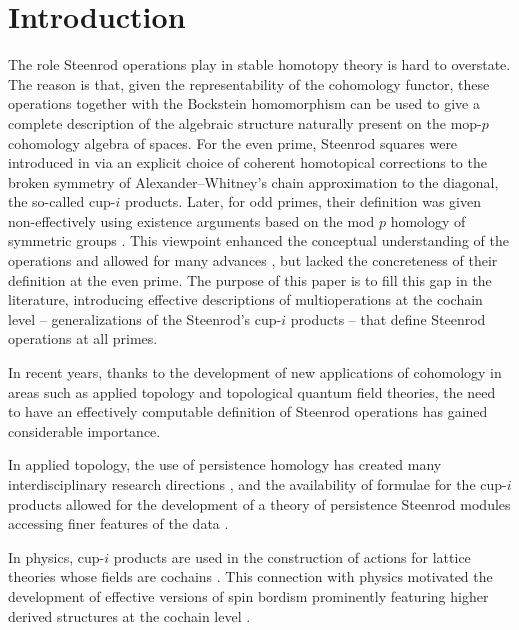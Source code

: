 
\section{Introduction} \label{s:introduction}

The role Steenrod operations play in stable homotopy theory is hard to overstate.
The reason is that, given the representability of the cohomology functor, these operations together with the Bockstein homomorphism can be used to give a complete description of the algebraic structure naturally present on the mop-$p$ cohomology algebra of spaces.
For the even prime, Steenrod squares were introduced in \cite{steenrod1947products} via an explicit choice of coherent homotopical corrections to the broken symmetry of Alexander--Whitney's chain approximation to the diagonal, the so-called cup-$i$ products.
Later, for odd primes, their definition was given non-effectively using existence arguments based on the mod $p$ homology of symmetric groups \cite{steenrod1952reduced, steenrod1962cohomology, steenrod1962cohomology}.
This viewpoint enhanced the conceptual understanding of the operations and allowed for many advances \cite{adem1952iteration, milnor1958dual, adams1995stable}, but lacked the concreteness of their definition at the even prime.
The purpose of this paper is to fill this gap in the literature, introducing effective descriptions of multioperations at the cochain level -- generalizations of the Steenrod's cup-$i$ products -- that define Steenrod operations at all primes.

In recent years, thanks to the development of new applications of cohomology in areas such as applied topology and topological quantum field theories, the need to have an effectively computable definition of Steenrod operations has gained considerable importance.

In applied topology, the use of persistence homology \cite{edelsbrunner2002topological, carlsson2005barcode} has created many interdisciplinary research directions \cite{chan2013viral, hess2017cliques}, and the availability of formulae for the cup-$i$ products allowed for the development of a theory of persistence Steenrod modules accessing finer features of the data \cite{medina2018persistence}.

In physics, cup-$i$ products are used in the construction of actions for lattice theories whose fields are cochains \cite{gaiotto2016spin, bhardwaj2017fermionic, kapustin2017fermionic}.
This connection with physics motivated the development of effective versions of spin bordism \cite{brumfiel2016pontrjagin, brumfiel2018pontrjagin} prominently featuring higher derived structures at the cochain level \cite{medina2020cartan, medina2021adem}.

